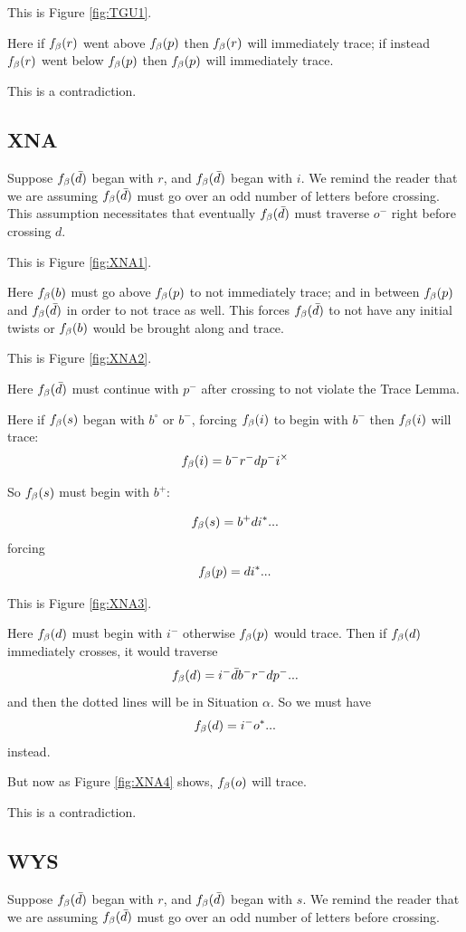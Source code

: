 This is Figure \ref{fig:TGU1}.

Here if $f_\beta(r)$ went above $f_\beta(p)$ then $f_\beta(r)$ will immediately trace; if instead $f_\beta(r)$ went below $f_\beta(p)$ then $f_\beta(p)$ will immediately trace.

This is a contradiction.

\subsection{XNA}\label{XNA}
Suppose $f_\beta(\bar{d})$ began with $r$, and $f_\beta(\bar{d})$ began with $i$. We remind the reader that we are assuming $f_\beta(\bar{d})$ must go over an odd number of letters before crossing. This assumption necessitates that eventually $f_\beta(\bar{d})$ must traverse $o^-$ right before crossing $d$.

This is Figure \ref{fig:XNA1}.

Here $f_\beta(b)$ must go above $f_\beta(p)$ to not immediately trace; and in between $f_\beta(p)$ and $f_\beta(\bar{d})$ in order to not trace as well. This forces $f_\beta(\bar{d})$ to not have any initial twists or $f_\beta(b)$ would be brought along and trace. 

This is Figure \ref{fig:XNA2}.

Here $f_\beta(\bar{d})$ must continue with $p^-$ after crossing to not violate the Trace Lemma.

Here if $f_\beta(s)$ began with $b^\circ$ or $b^-$, forcing $f_\beta(i)$ to begin with $b^-$ then $f_\beta(i)$ will trace:
\[
f_\beta(i) = b^- r^- d p^- i^\times
\]

So $f_\beta(s)$ must begin with $b^+$:

\[
f_\beta(s) = b^+ d i^*...
\]
forcing 
\[
f_\beta(p) = d i^*...
\]

This is Figure \ref{fig:XNA3}.

Here $f_\beta(d)$ must begin with $i^-$ otherwise $f_\beta(p)$ would trace. Then if $f_\beta(d)$ immediately crosses, it would traverse
\[
f_\beta(d) = i^- \bar{d} b^- r^- d p^-...
\]
and then the dotted lines will be in Situation $\alpha$. So we must have
\[
f_\beta(d) = i^- o^*...
\]
instead.

But now as Figure \ref{fig:XNA4} shows, $f_\beta(o)$ will trace.

This is a contradiction.

\subsection{WYS}\label{WYS}
Suppose $f_\beta(\bar{d})$ began with $r$, and $f_\beta(\bar{d})$ began with $s$. We remind the reader that we are assuming $f_\beta(\bar{d})$ must go over an odd number of letters before crossing. 

